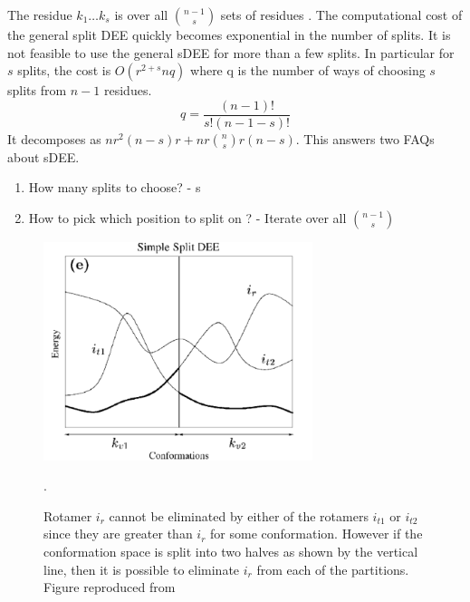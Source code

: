 \documentclass{article}
\begin{document}
The residue $k_1\dots k_s$ is over all $n-1 \choose s$ sets of residues . The computational cost of the general split DEE quickly becomes exponential in the number of splits.  It is not feasible to use the general sDEE for more than a few splits. In particular for $s$ splits, the cost is $O(r^{2+s}nq)$  where q is the number of ways of choosing $s$ splits from $n-1$ residues.
\[
q = \frac{(n-1)!}{s!(n-1-s)!}
\]
It decomposes as $nr^2(n-s)r + nr{n\choose s}r(n-s)$. This answers two FAQs about sDEE. 
\begin{enumerate}
\item How many splits to choose? - s
\item How to pick which position to split on ? - Iterate over all $n-1 \choose s$
\end{enumerate}

\begin{figure}[h!]
    \centering
    \includegraphics[width=0.7\textwidth]{pics/split1.pdf}
    \caption{Rotamer $i_r$ cannot be eliminated by either of the rotamers $i_{t1}$ or $i_{t2}$ since they are greater than $i_r$ for some conformation. However if the conformation space is split into two halves as shown by the vertical line, then it is possible to eliminate $i_r$ from each of the partitions. Figure reproduced from~\cite{Pierce2000}}.
    \label{fig:splitDEE}
\end{figure}
\pagebreak
\end{document}
